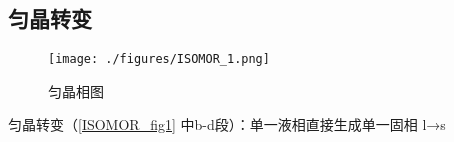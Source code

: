
\subsection{匀晶转变}

\begin{figure}[ht]
\centering
\texttt{[image: ./figures/ISOMOR\_1.png]}
\caption{匀晶相图} \label{ISOMOR_fig1}
\end{figure}

匀晶转变（\autoref{ISOMOR_fig1} 中b-d段）：单一液相直接生成单一固相 l→s
